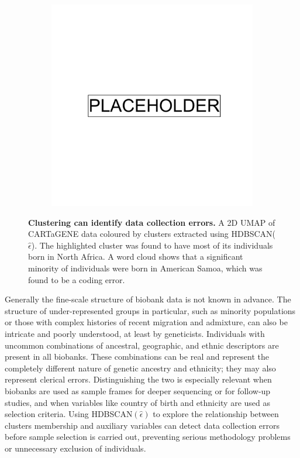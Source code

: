\begin{figure}[ht]
  \centering
  \begin{subfigure}[b]{0.95\linewidth}
  \includegraphics[width=0.5\linewidth]{placeholder.png}
  \end{subfigure}
  \caption[Clustering identifies data collection errors in CaG]{\textbf{Clustering can identify data collection errors.} A 2D UMAP of CARTaGENE data coloured by clusters extracted using HDBSCAN($\hat{\epsilon}$). The highlighted cluster was found to have most of its individuals born in North Africa. A word cloud shows that a significant minority of individuals were born in American Samoa, which was found to be a coding error.}
    \label{fig:ctg}
\end{figure}

Generally the fine-scale structure of biobank data is not known in advance. The structure of under-represented groups in particular, such as minority populations or those with complex histories of recent migration and admixture, can also be intricate and poorly understood, at least by geneticists. Individuals with uncommon combinations of ancestral, geographic, and ethnic descriptors are present in all biobanks. These combinations can be real and represent the completely different nature of genetic ancestry and ethnicity; they may also represent clerical errors\citep{macleod_principles_2009}. Distinguishing the two is especially relevant when biobanks are used as sample frames for deeper sequencing or for follow-up studies, and when variables like country of birth and ethnicity are used as selection criteria. Using HDBSCAN$(\hat{\epsilon})$ to explore the relationship between clusters membership and auxiliary variables can detect data collection errors before sample selection is carried out, preventing serious methodology problems or unnecessary exclusion of individuals.

